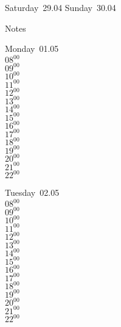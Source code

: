 \documentclass[11pt,a4paper]{book}\usepackage[]{graphicx}\usepackage[]{color}
\begin{document}
\begin{weekendbox}
  Saturday~29.04
  \tcblower
  Sunday~30.04
\end{weekendbox} %
\begin{notebox}
  Notes
\end{notebox}
\clearpage
\begin{headerbox}
\end{headerbox}
\begin{weekdaybox}
  Monday~01.05\\
  { 
  \vfill
  $08^{00}$\\
$09^{00}$\\
$10^{00}$\\
$11^{00}$\\
$12^{00}$\\
$13^{00}$\\
$14^{00}$\\
$15^{00}$\\
$16^{00}$\\
$17^{00}$\\
$18^{00}$\\
$19^{00}$\\
$20^{00}$\\
$21^{00}$\\
$22^{00}$\\
  }
\end{weekdaybox}
\begin{weekdaybox}
  Tuesday~02.05\\
  { 
  \vfill
  $08^{00}$\\
$09^{00}$\\
$10^{00}$\\
$11^{00}$\\
$12^{00}$\\
$13^{00}$\\
$14^{00}$\\
$15^{00}$\\
$16^{00}$\\
$17^{00}$\\
$18^{00}$\\
$19^{00}$\\
$20^{00}$\\
$21^{00}$\\
$22^{00}$\\
  }
\end{weekdaybox}
\end{document}
